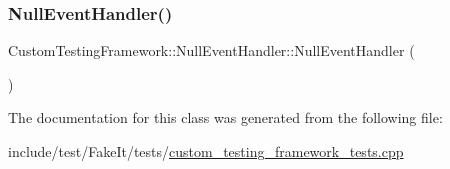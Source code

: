 \subsubsection{\texorpdfstring{NullEventHandler()}{NullEventHandler()}}
{\footnotesize\ttfamily Custom\+Testing\+Framework\+::\+Null\+Event\+Handler\+::\+Null\+Event\+Handler (\begin{DoxyParamCaption}{ }\end{DoxyParamCaption})\hspace{0.3cm}{\ttfamily [default]}}



The documentation for this class was generated from the following file\+:\begin{DoxyCompactItemize}
\item 
include/test/\+Fake\+It/tests/\mbox{\hyperlink{custom__testing__framework__tests_8cpp}{custom\+\_\+testing\+\_\+framework\+\_\+tests.\+cpp}}\end{DoxyCompactItemize}
